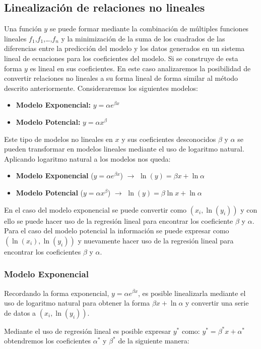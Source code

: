 \documentclass[11pt,letterpaper]{article}
\begin{document}
\subsection{Linealización de relaciones no lineales}
Una función $y$ se puede formar mediante la combinación de múltiples funciones lineales $f_1$,$f_1$,\dots,$f_n$ y la minimización de la suma de los cuadrados de las diferencias entre la predicción del modelo y los datos generados en un sistema lineal de ecuaciones para los coeficientes del modelo. Si se construye de esta forma $y$ es lineal en sus coeficientes. En este caso analizaremos la posibilidad de convertir relaciones no lineales a su forma lineal de forma similar al método descrito anteriormente.\cite{ualberta} Consideraremos los siguientes modelos:
\begin{itemize}
	\item \textbf{Modelo Exponencial:} $y = \alpha e^{\beta x}$
	\item \textbf{Modelo Potencial:} $y = \alpha x^{\beta}$
\end{itemize}
\par Este tipo de modelos no lineales en $x$ y sus coeficientes desconocidos $\beta$ y $\alpha$ se pueden transformar en modelos lineales mediante el uso de logaritmo natural. Aplicando logaritmo natural a los modelos nos queda:
\begin{itemize}
	\item \textbf{Modelo Exponencial }($y = \alpha e^{\beta x}$) $\longrightarrow$ $\ln(y) = \beta x + \ln \alpha$
	\item \textbf{Modelo Potencial} ($y = \alpha x^{\beta}$) $\longrightarrow$ $\ln(y) = \beta \ln x + \ln \alpha$
\end{itemize}
\par 
En el caso del modelo exponencial se puede convertir como $(x_i, \ln(y_i))$ y con ello se puede hacer uso de la regresión lineal  para encontrar los coeficiente $\beta$ y $\alpha$. Para el caso del modelo potencial la información se puede expresar como $(\ln(x_i), \ln(y_i))$ y nuevamente hacer uso de la regresión lineal para encontrar los coeficientes $\beta$ y $\alpha$.\cite{ualberta}\cite{nieves2011metodos} 

\subsubsection{Modelo Exponencial}
Recordando la forma exponencial, $y = \alpha e^{\beta x}$, es posible linealizarla mediante el uso de logaritmo natural para obtener la forma $\beta x + \ln \alpha$ y convertir una serie de datos a $(x_i, \ln(y_i))$.  \cite{ualberta}
\par
Mediante el uso de regresión lineal es posible expresar $y^*$ como: \textbf{$y^* = \beta^* x + \alpha^*$ 	} obtendremos los coeficientes $\alpha^*$ y $\beta^*$ de la siguiente manera:
\end{document}
